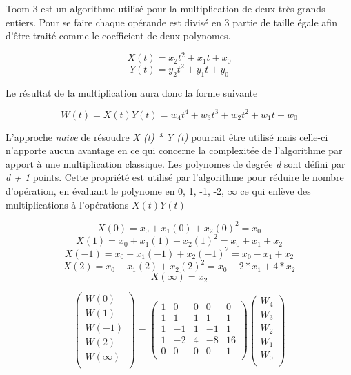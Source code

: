 \documentclass[letterpaper]{article}
\begin{document}
Toom-3 est un algorithme utilisé pour  la multiplication de deux très grands
entiers. Pour se faire chaque opérande est divisé en 3 partie de taille égale
afin d'être traité comme le coefficient de deux polynomes.\cite{gmplib2014}

    $$X(t) = x_2 t^2 + x_1 t + x_0$$
    $$Y(t) = y_2 t^2 + y_1 t + y_0$$

Le résultat de la multiplication aura donc la forme suivante

    $$W(t) = X(t) Y(t) =  w_4 t^4 + w_3 t^3 + w_2 t^2 + w_1 t + w_0$$

L'approche \emph{naive} de résoudre \emph{X (t) * Y (t)} pourrait être utilisé
mais celle-ci n'apporte aucun avantage en ce qui concerne la complexitée de
l'algorithme par apport à une multiplication classique.\cite{gmplib2014}
\newline
Les polynomes de degrée \emph{d} sont défini par \emph{d + 1} points. Cette
propriété est utilisé par l'algorithme pour réduire le nombre d'opération, en
évaluant le polynome en 0, 1, -1, -2, $\infty$ ce qui enlève des multiplications
à l'opérations $X(t) Y(t)$\cite{wikitoom3}

    $$X (0) = x_{0} + x_{1} (0) + x_2 {(0)}^{2} = x_{0}$$
    $$X(1) = x_0 + x_1(1) + x_2{(1)}^2 = x_0 + x_1 + x_2$$
    $$X(-1) = x_0 + x_1(-1) + x_2{(-1)}^2 = x_0 - x_1 + x_2$$
    $$X(2) = x_0 + x_1(2) + x_2{(2)}^2 = x_0 - 2 * x_1 + 4 * x_2$$
    $$X(\infty) = x_2$$

$$
\begin{pmatrix}
  W (0) \\
  W (1) \\
  W (-1) \\
  W (2) \\
  W (\infty) \\
\end{pmatrix}
 =
\begin{pmatrix}
  1 & 0 & 0 & 0 & 0 \\
  1 & 1 & 1 & 1 & 1 \\
  1 &-1 & 1 &-1 & 1 \\
  1 &-2 & 4 &-8 &16 \\
  0 & 0 & 0 & 0 & 1 \\
\end{pmatrix}
\begin{pmatrix}
  W_4 \\
  W_3 \\
  W_2 \\
  W_1 \\
  W_0 \\
\end{pmatrix}
$$
\end{document}
